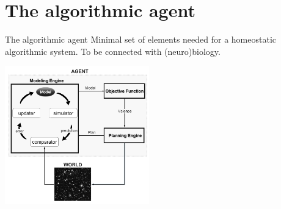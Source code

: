 \section{The algorithmic agent}

\begin{frame}[label=ladila]{The algorithmic agent}
Minimal set of elements needed for a homeostatic algorithmic system. To be connected with (neuro)biology.
 \begin{center}
  \includegraphics[height=6cm]{img/Figure1_StructuredDynamics.png}
  \end{center}

\end{frame}



